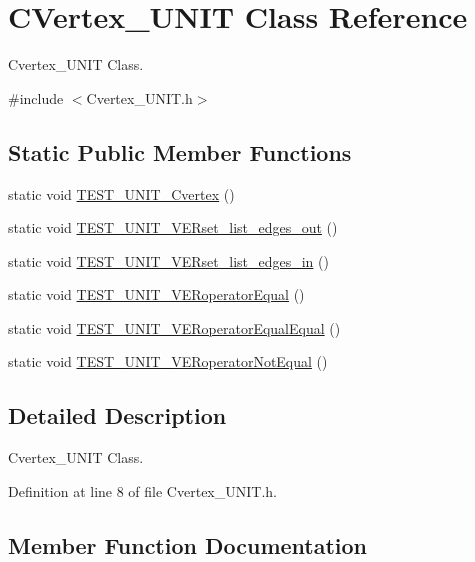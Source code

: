 \hypertarget{class_c_vertex___u_n_i_t}{}\section{C\+Vertex\+\_\+\+U\+N\+I\+T Class Reference}
\label{class_c_vertex___u_n_i_t}


Cvertex\+\_\+\+U\+N\+I\+T Class.  




{\ttfamily \#include $<$Cvertex\+\_\+\+U\+N\+I\+T.\+h$>$}

\subsection*{Static Public Member Functions}
\begin{DoxyCompactItemize}
\item 
static void \hyperlink{class_c_vertex___u_n_i_t_a5eea2f9accdb6ed8790d8c12bf799d42}{T\+E\+S\+T\+\_\+\+U\+N\+I\+T\+\_\+\+Cvertex} ()
\item 
static void \hyperlink{class_c_vertex___u_n_i_t_aee7531c671c23531cc4221693fe42fc1}{T\+E\+S\+T\+\_\+\+U\+N\+I\+T\+\_\+\+V\+E\+Rset\+\_\+list\+\_\+edges\+\_\+out} ()
\item 
static void \hyperlink{class_c_vertex___u_n_i_t_a74e894312766ed9aca3872c1409971fc}{T\+E\+S\+T\+\_\+\+U\+N\+I\+T\+\_\+\+V\+E\+Rset\+\_\+list\+\_\+edges\+\_\+in} ()
\item 
static void \hyperlink{class_c_vertex___u_n_i_t_a925903e20eea2432b3d8b105e426ca1f}{T\+E\+S\+T\+\_\+\+U\+N\+I\+T\+\_\+\+V\+E\+Roperator\+Equal} ()
\item 
static void \hyperlink{class_c_vertex___u_n_i_t_aa6adff8bd6bab034eaca5b1321f43c77}{T\+E\+S\+T\+\_\+\+U\+N\+I\+T\+\_\+\+V\+E\+Roperator\+Equal\+Equal} ()
\item 
static void \hyperlink{class_c_vertex___u_n_i_t_a08e2fceaad9c171ff46176b1c3c5349c}{T\+E\+S\+T\+\_\+\+U\+N\+I\+T\+\_\+\+V\+E\+Roperator\+Not\+Equal} ()
\end{DoxyCompactItemize}


\subsection{Detailed Description}
Cvertex\+\_\+\+U\+N\+I\+T Class. 

Definition at line 8 of file Cvertex\+\_\+\+U\+N\+I\+T.\+h.



\subsection{Member Function Documentation}
\hypertarget{class_c_vertex___u_n_i_t_a5eea2f9accdb6ed8790d8c12bf799d42}{}
